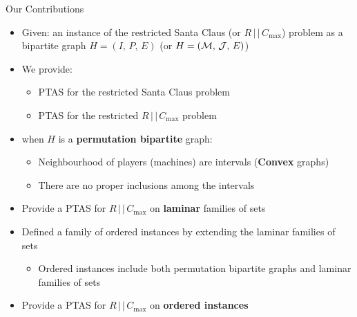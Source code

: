 \begin{frame}[t]{Our Contributions}
\label{ptas_contributions}
    \begin{itemize}
        \item<2-> Given: an instance of the restricted Santa Claus  (or $R \, | \, |  \, C_{\max}$) problem as a bipartite graph $H = (I, \, P, \, E)$ (or $H = (\mathcal{M}, \, \mathcal{J}, \, E)$)
        \item<3-> We provide: 
            \begin{itemize}
                \item<4-> \alert{PTAS for the restricted Santa Claus problem}
                \item<5-> \alert{PTAS for the restricted $R \, | \, |  \, C_{\max}$ problem}
            \end{itemize}
        \item<6->[ ] when $H$ is a \textbf{permutation bipartite} graph:
            \begin{itemize}
                \item<7-> Neighbourhood of players (machines) are intervals (\textbf{Convex} graphs)
                \label{convex}
                \item<8-> There are no proper inclusions among the intervals
            \end{itemize}
        \item<9-> Provide a \alert{PTAS for $R \, | \, |  \, C_{\max}$} on \textbf{laminar} families of sets
        \item<10-> Defined a family of \alert{ordered instances} by extending the laminar families of sets       
            \begin{itemize}
                \item<11-> Ordered instances include both permutation bipartite graphs and laminar families of sets
            \end{itemize}
        \item<12-> Provide a \alert{PTAS for $R \, | \, |  \, C_{\max}$} on \textbf{ordered instances}
    \end{itemize}
\end{frame}

